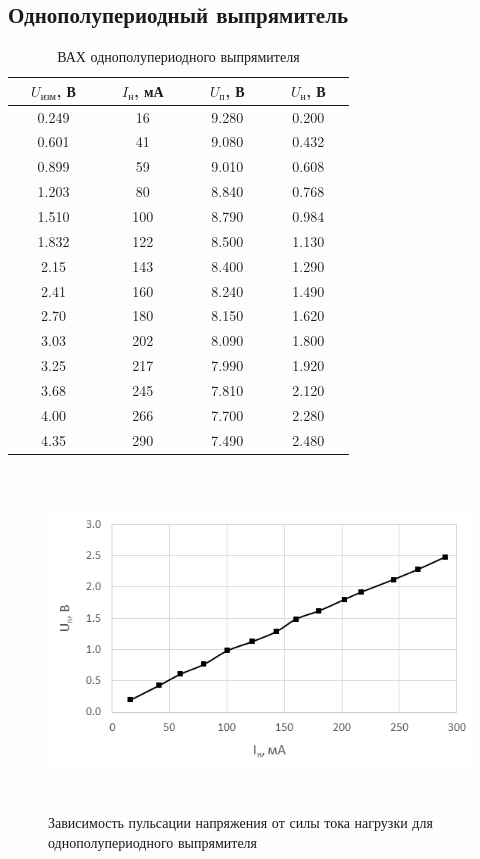 \subsection{Однополупериодный выпрямитель}

\begin{table}[H]
	\begin{center}
	\caption{ВАХ однополупериодного выпрямителя}
	\def\arraystretch{1.25}
		\begin{tabular}{|c|c|c|c|}
		\hline 
		\ \ $U_\text{изм}$, В\ \  & \ \ $I_\text{н}$, мА\ \  & \ \ $U_\text{п}$, В\ \  & \ \ $U_\text{н}$, В\ \  \\ \hline
		0.249 & 16 & 9.280 & 0.200 \\ \hline
		0.601 & 41 & 9.080 & 0.432 \\ \hline
		0.899 & 59 & 9.010 & 0.608 \\ \hline
		1.203 & 80 & 8.840 & 0.768 \\ \hline
		1.510 & 100 & 8.790 & 0.984 \\ \hline
		1.832 & 122 & 8.500 & 1.130 \\ \hline
		2.15 & 143 & 8.400 & 1.290 \\ \hline
		2.41 & 160 & 8.240 & 1.490 \\ \hline
		2.70 & 180 & 8.150 & 1.620 \\ \hline
		3.03 & 202 & 8.090 & 1.800 \\ \hline
		3.25 & 217 & 7.990 & 1.920 \\ \hline
		3.68 & 245 & 7.810 & 2.120 \\ \hline
		4.00 & 266 & 7.700 & 2.280 \\ \hline
		4.35 & 290 & 7.490 & 2.480 \\ \hline
		\end{tabular} 
		\label{tab:5:2}
	\end{center}
\end{table}

\begin{figure}[H]
	\begin{center}
		\includegraphics[width=15cm,height=9cm]{img/2}
		\caption{Зависимость пульсации напряжения от силы тока нагрузки для однополупериодного выпрямителя}
		\label{g:2} %
	\end{center}
\end{figure}

